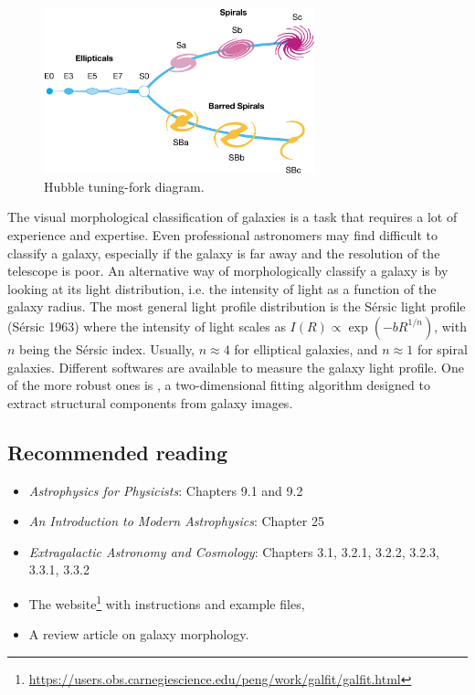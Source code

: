 \documentclass[a4paper, 11pt, fleqn]{memoir}
\begin{document}
\begin{figure}
    \centering
    \includegraphics[width=0.7\textwidth]{tuningfork}
    \caption{Hubble tuning-fork diagram.}
    \label{fig:tuningfork}
\end{figure}

The visual morphological classification of galaxies is a task that requires a lot of experience and expertise.
Even professional astronomers may find difficult to classify a galaxy, especially if the galaxy is far away and the resolution of the telescope is poor.
An alternative way of morphologically classify a galaxy is by looking at its light distribution, i.e. the intensity of light as a function of the galaxy radius.
The most general light profile distribution is the Sérsic light profile (Sérsic 1963) where the intensity of light scales as $I(R) \propto \exp(-b R^{1/n})$, with $n$ being the Sérsic index.
Usually, $n \approx 4$ for elliptical galaxies, and $n \approx 1$ for spiral galaxies.
Different softwares are available to measure the galaxy light profile.
One of the more robust ones is \autocite{Peng2010Galfit}, a two-dimensional fitting algorithm designed to extract
structural components from galaxy images.

\subsection{Recommended reading}
\begin{itemize}
    \item \emph{Astrophysics for Physicists}\autocite{Choudhuri}: Chapters 9.1 and 9.2
    \item \emph{An Introduction to Modern Astrophysics}\autocite{carroll2017introduction}: Chapter 25
    \item \emph{Extragalactic Astronomy and Cosmology}\autocite{Schneider2006ExtragalacticAstronomy}: Chapters 3.1, 3.2.1, 3.2.2, 3.2.3, 3.3.1, 3.3.2
    \item The  website\footnote{\url{https://users.obs.carnegiescience.edu/peng/work/galfit/galfit.html}} with instructions and example files,
    \item A review article on galaxy morphology\autocite{Buta2013GalaxyMorphology}.
\end{itemize}
\end{document}
